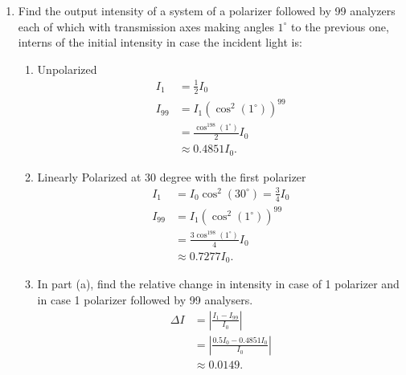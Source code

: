 \documentclass{zc-ust-hw}
\begin{document}
\begin{enumerate}
  \item Find the output intensity of a system of a polarizer followed by 99
    analyzers each of which with transmission axes making angles $1^\circ$ to the
    previous one, interns of the initial intensity in case the incident light
    is:
    \begin{enumerate}
      \item Unpolarized
        \begin{align}
          I_1 &= \frac{1}{2} I_0 \\
          I_{99} &= I_1 \left( \cos^2(1^\circ) \right)^{99} \\
                 &= \frac{\cos^{198}(1^\circ)}{2} I_0 \\
                 &\approx 0.4851 I_0
        .\end{align}
      \item Linearly Polarized at 30 degree with the first polarizer
        \begin{align}
          I_1 &= I_0 \cos^2(30^\circ) = \frac{3}{4} I_0 \\
          I_{99} &= I_1 \left( \cos^2(1^\circ) \right)^{99} \\
                 &= \frac{3 \cos^{198}(1^\circ)}{4} I_0 \\
                 &\approx 0.7277 I_0
        .\end{align}
      \item In part (a), find the relative change in intensity in case of 1
        polarizer and in case 1 polarizer followed by 99 analysers.
        \begin{align}
          \Delta I &= \left| \frac{I_1-I_{99}}{I_0} \right| \\
                   &= \left| \frac{0.5I_0-0.4851I_0}{I_0} \right| \\
                   &\approx 0.0149
        .\end{align}
    \end{enumerate}

\end{enumerate}
\end{document}
